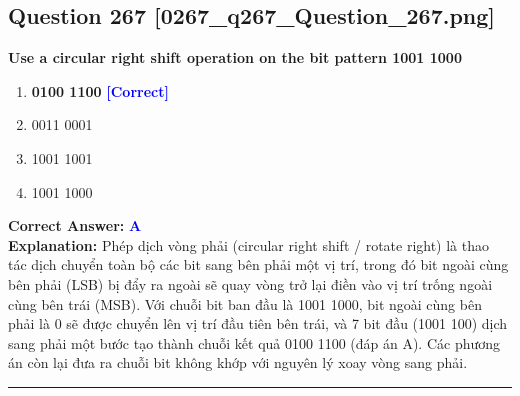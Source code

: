 \documentclass[11pt,a4paper]{article}
\begin{document}
\begin{minipage}{\textwidth}
\subsection*{Question 267 \quad \footnotesize{[0267\_q267\_Question\_267.png]}}
\noindent \textbf{Use a circular right shift operation on the bit pattern 1001 1000}

\begin{enumerate}[label=\Alph*.]
    \item \textbf{0100 1100} \hfill \textcolor{blue}{\textbf{[Correct]}}
    \item 0011 0001
    \item 1001 1001
    \item 1001 1000
\end{enumerate}

\noindent \textbf{Correct Answer:} \textcolor{blue}{\textbf{A}} \\[2pt]
\noindent \textbf{Explanation:} Phép dịch vòng phải (circular right shift / rotate right) là thao tác dịch chuyển toàn bộ các bit sang bên phải một vị trí, trong đó bit ngoài cùng bên phải (LSB) bị đẩy ra ngoài sẽ quay vòng trở lại điền vào vị trí trống ngoài cùng bên trái (MSB). Với chuỗi bit ban đầu là 1001 1000, bit ngoài cùng bên phải là 0 sẽ được chuyển lên vị trí đầu tiên bên trái, và 7 bit đầu (1001 100) dịch sang phải một bước tạo thành chuỗi kết quả 0100 1100 (đáp án A). Các phương án còn lại đưa ra chuỗi bit không khớp với nguyên lý xoay vòng sang phải.

\par\vspace{0.3cm}
\hrule
\vspace{0.3cm}
\end{minipage}
\end{document}
